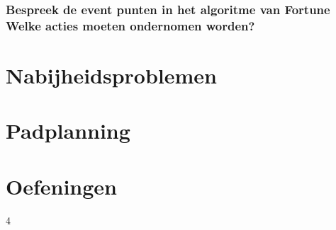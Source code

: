 \documentclass[12pt,a4paper]{article}
\begin{document}
\section{Bespreek de event punten in het algoritme van Fortune Welke acties moeten ondernomen worden?}
\fi

\part{Nabijheidsproblemen}
\iffalse
\section{wat betekent volgende uitspraak: probleem A is ?(N) transformeerbaar tot probleem B? waarvoor kan een dergelijke uitspraak nuttig gebruikt worden + vb}
\section{wat is een EMDB van een vz punten + verband met Voronoi diagramma van een vz punten?}
\section{bespreek beknopt hoe een EMDB van een vz punten kan berkend worden in O(nlogn) bewerkingen}
\fi

\part{Padplanning}
\iffalse
\section{Hoe bepaal je het gebied dat kan bereikt worden door een robotarm met 3 segmenten. Is de volgorde van de stukken belangrijk?}
\section{Geef en bespreek de minkovski-som met een voorbeeld.}
\fi
\fi

\part{Oefeningen}




4





\end{document}
